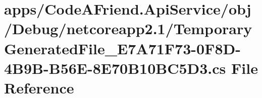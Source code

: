 \hypertarget{apps_2_code_a_friend_8_api_service_2obj_2_debug_2netcoreapp2_81_2_temporary_generated_file___e7_68889347d6a22f0c46276aac1600fc8d}{}\section{apps/\+Code\+A\+Friend.Api\+Service/obj/\+Debug/netcoreapp2.1/\+Temporary\+Generated\+File\+\_\+\+E7\+A71\+F73-\/0\+F8\+D-\/4\+B9\+B-\/\+B56\+E-\/8\+E70\+B10\+B\+C5\+D3.cs File Reference}
\label{apps_2_code_a_friend_8_api_service_2obj_2_debug_2netcoreapp2_81_2_temporary_generated_file___e7_68889347d6a22f0c46276aac1600fc8d}
